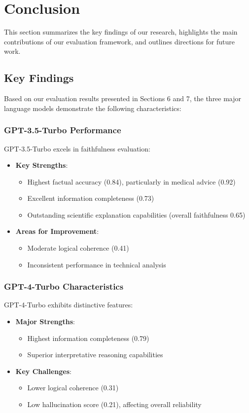 \section{Conclusion}
This section summarizes the key findings of our research, highlights the main contributions of our evaluation framework, and outlines directions for future work.

\subsection{Key Findings}
Based on our evaluation results presented in Sections 6 and 7, the three major language models demonstrate the following characteristics:

\subsubsection{GPT-3.5-Turbo Performance}
GPT-3.5-Turbo excels in faithfulness evaluation:
\begin{itemize}
    \item \textbf{Key Strengths}:
    \begin{itemize}
        \item Highest factual accuracy (0.84), particularly in medical advice (0.92)
        \item Excellent information completeness (0.73)
        \item Outstanding scientific explanation capabilities (overall faithfulness 0.65)
    \end{itemize}
    \item \textbf{Areas for Improvement}:
    \begin{itemize}
        \item Moderate logical coherence (0.41)
        \item Inconsistent performance in technical analysis
    \end{itemize}
\end{itemize}

\subsubsection{GPT-4-Turbo Characteristics}
GPT-4-Turbo exhibits distinctive features:
\begin{itemize}
    \item \textbf{Major Strengths}:
    \begin{itemize}
        \item Highest information completeness (0.79)
        \item Superior interpretative reasoning capabilities
    \end{itemize}
    \item \textbf{Key Challenges}:
    \begin{itemize}
        \item Lower logical coherence (0.31)
        \item Low hallucination score (0.21), affecting overall reliability
    \end{itemize}
\end{itemize}

